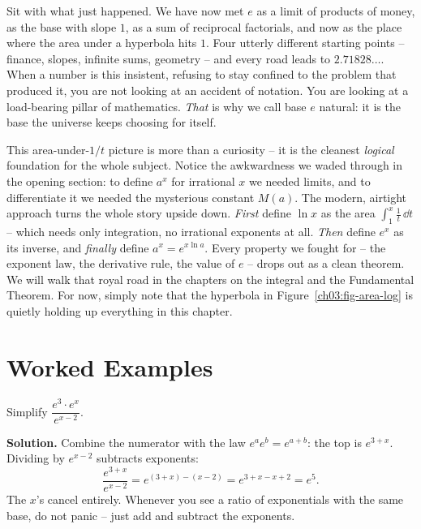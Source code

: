 \begin{aestheticbox}
Sit with what just happened. We have now met $e$ as a limit of products of money, as the base with slope $1$, as a sum of reciprocal factorials, and now as the place where the area under a hyperbola hits $1$. Four utterly different starting points -- finance, slopes, infinite sums, geometry -- and every road leads to $2.71828\ldots$. When a number is this insistent, refusing to stay confined to the problem that produced it, you are not looking at an accident of notation. You are looking at a load-bearing pillar of mathematics. \emph{That} is why we call base $e$ natural: it is the base the universe keeps choosing for itself.
\end{aestheticbox}

\begin{connectionbox}
This area-under-$1/t$ picture is more than a curiosity -- it is the cleanest \emph{logical} foundation for the whole subject. Notice the awkwardness we waded through in the opening section: to define $a^x$ for irrational $x$ we needed limits, and to differentiate it we needed the mysterious constant $M(a)$. The modern, airtight approach turns the whole story upside down. \emph{First} define $\ln x$ as the area $\int_1^x \frac{1}{t}\,\dd t$ -- which needs only integration, no irrational exponents at all. \emph{Then} define $e^x$ as its inverse, and \emph{finally} define $a^x = e^{x\ln a}$. Every property we fought for -- the exponent law, the derivative rule, the value of $e$ -- drops out as a clean theorem. We will walk that royal road in the chapters on the integral and the Fundamental Theorem. For now, simply note that the hyperbola in Figure~\ref{ch03:fig-area-log} is quietly holding up everything in this chapter.
\end{connectionbox}

\section{Worked Examples}

\begin{example}\label{ch03:ex-law}
Simplify $\dfrac{e^{3}\cdot e^{x}}{e^{x-2}}$.

\textbf{Solution.} Combine the numerator with the law $e^a e^b = e^{a+b}$: the top is $e^{3+x}$. Dividing by $e^{x-2}$ subtracts exponents:
\[
\frac{e^{3+x}}{e^{x-2}} = e^{(3+x)-(x-2)} = e^{3+x-x+2} = e^{5}.
\]
The $x$'s cancel entirely. Whenever you see a ratio of exponentials with the same base, do not panic -- just add and subtract the exponents.
\end{example}

